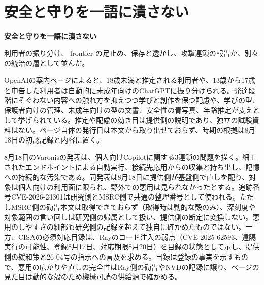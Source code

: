 \section{安全と守りを一語に潰さない}
\begin{wideflow}
{\Large\bfseries 安全と守りを一語に潰さない}\par
\smallskip
{\color{SurveyMuted}利用者の振り分け、 frontier の足止め、保存と透かし、攻撃連鎖の報告が、別々の統治の層として並んだ。}\par
\end{wideflow}

\noindent OpenAIの案内ページによると、18歳未満と推定される利用者や、13歳から17歳と申告した利用者は自動的に未成年向けのChatGPTに振り分けられる。発達段階にそぐわない内容への触れ方を抑えつつ学びと創作を保つ配慮や、学びの型、保護者向けの管理、未成年向けの型の文書、安全性の青写真、年齢推定が支えとして挙げられている。推定や配慮の効き目は提供側の説明であり、独立の試験資料はない。ページ自体の発行日は本文から取り出せておらず、時期の根拠は8月18日の初認記録と内容に置く。 \cite{w2026w34w34eventc004}\par\medskip

\noindent 8月18日のVaronisの発表は、個人向けCopilotに関する3連鎖の問題を描く。細工されたエンドポイントによる自動実行、接続先応用からの収集と持ち出し、記憶への持続的な汚染である。同発表は8月18日に提供側が基盤側で直しを配り、対象は個人向けの利用面に限られ、野外での悪用は見られなかったとする。追跡番号CVE-2026-24301は研究側とMSRC側で共通の整理番号として使われる。ただしMSRC側の勧告本文は取得できておらず（取得時は動的な殻のみ）、深刻度や対象範囲の言い回しは研究側の帰属として扱い、提供側の断定に変換しない。悪用のしやすさの細部も研究側の記録を超えて独自に確かめたものではない。一方、CISAの必須対応目録は、Rayのコード注入の弱点（CVE-2025-62593、遠隔実行の可能性、登録8月17日、対応期限8月20日）を目録の状態として示し、提供側の緩和策と26-04号の指示への言及を求める。目録は登録の事実を示すもので、悪用の広がりや直しの完全性はRay側の勧告やNVDの記録に譲り、ページの見た目は動的な殻のため機械可読の供給源で確かめる。 \cite{w2026w34w34eventc055,w2026w34w34eventc006}\par\medskip

